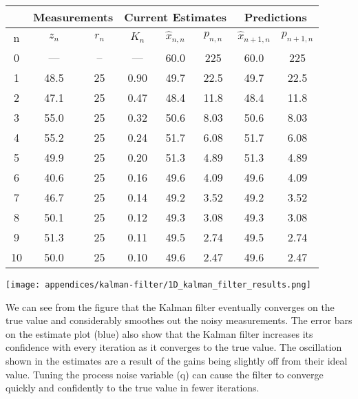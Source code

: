 \begin{fitbox}[frametitle=Example]
    \begin{center}
        \begin{tabular}{c | c | c | c | c | c | c | c}
        \toprule
        & \multicolumn{2}{c}{Measurements} & \multicolumn{3}{c}{Current Estimates} & \multicolumn{2}{c}{Predictions} \\
        \midrule
        n & $z_n$ & $r_n$ & $K_n$ & $\hat{x}_{n,n}$ & $ p_{n,n} $ & $ \hat{x}_{n+1,n}$ & $ p_{n+1,n} $ \\
        \midrule

        0  & ---  & -- & ---  & 60.0 & 225  & 60.0 & 225  \\
        1  & 48.5 & 25 & 0.90 & 49.7 & 22.5 & 49.7 & 22.5 \\
        2  & 47.1 & 25 & 0.47 & 48.4 & 11.8 & 48.4 & 11.8 \\
        3  & 55.0 & 25 & 0.32 & 50.6 & 8.03 & 50.6 & 8.03 \\
        4  & 55.2 & 25 & 0.24 & 51.7 & 6.08 & 51.7 & 6.08 \\
        5  & 49.9 & 25 & 0.20 & 51.3 & 4.89 & 51.3 & 4.89 \\
        6  & 40.6 & 25 & 0.16 & 49.6 & 4.09 & 49.6 & 4.09 \\
        7  & 46.7 & 25 & 0.14 & 49.2 & 3.52 & 49.2 & 3.52 \\
        8  & 50.1 & 25 & 0.12 & 49.3 & 3.08 & 49.3 & 3.08 \\
        9  & 51.3 & 25 & 0.11 & 49.5 & 2.74 & 49.5 & 2.74 \\
        10 & 50.0 & 25 & 0.10 & 49.6 & 2.47 & 49.6 & 2.47 \\

        \bottomrule
        \end{tabular}
    \end{center}

    \begin{center}
        \texttt{[image: appendices/kalman-filter/1D\_kalman\_filter\_results.png]}
    \end{center}

    We can see from the figure that the Kalman filter eventually converges on the true value and considerably smoothes out the noisy measurements.
    The error bars on the estimate plot (blue) also show that the Kalman filter increases its confidence with every iteration as it converges to the true value.
    The oscillation shown in the estimates are a result of the gains being slightly off from their ideal value.
    Tuning the process noise variable (q) can cause the filter to converge quickly and confidently to the true value in fewer iterations.

\end{fitbox}

